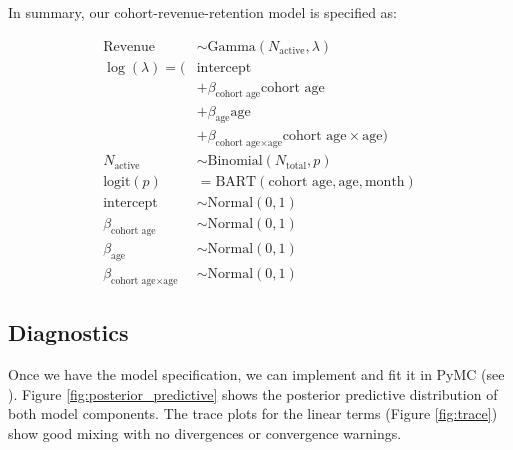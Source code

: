 \documentclass[11pt]{amsart}
\theoremstyle{definition}
\begin{document}
In summary, our cohort-revenue-retention model is specified as:

\begin{align*}
    \text{Revenue}                              & \sim \text{Gamma}(N_{\text{active}}, \lambda)                                      \\
    \log(\lambda) = (                           & \text{intercept}                                                                   \\
                                                & + \beta_{\text{cohort age}} \text{cohort age}                                      \\
                                                & + \beta_{\text{age}} \text{age}                                                    \\
                                                & + \beta_{\text{cohort age} \times \text{age}} \text{cohort age} \times \text{age}) \\
    N_{\text{active}}                           & \sim \text{Binomial}(N_{\text{total}}, p)                                          \\
    \textrm{logit}(p)                           & = \text{BART}(\text{cohort age}, \text{age}, \text{month})                         \\
    \text{intercept}                            & \sim \text{Normal}(0, 1)                                                           \\
    \beta_{\text{cohort age}}                   & \sim \text{Normal}(0, 1)                                                           \\
    \beta_{\text{age}}                          & \sim \text{Normal}(0, 1)                                                           \\
    \beta_{\text{cohort age} \times \text{age}} & \sim \text{Normal}(0, 1)
\end{align*}

\subsection{Diagnostics}

Once we have the model specification, we can implement and fit it in PyMC (see \cite{orduz_revenue_retention}). Figure
\ref{fig:posterior_predictive} shows the posterior predictive distribution of both model components. The trace plots for the
linear terms (Figure \ref{fig:trace}) show good mixing with no divergences or convergence warnings.
\end{document}
